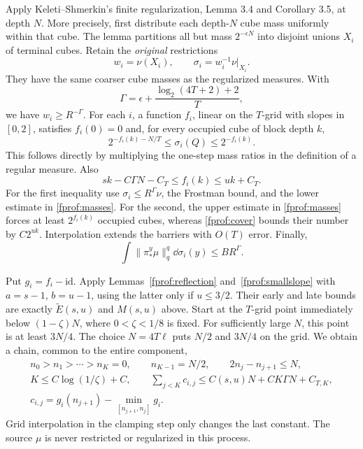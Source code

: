 Apply Keleti--Shmerkin's finite regularization, Lemma 3.4 and Corollary 3.5, at depth \(N\). More precisely, first distribute each depth-\(N\) cube mass uniformly within that cube. The lemma partitions all but mass \(2^{-\epsilon N}\) into disjoint unions \(X_i\) of terminal cubes. Retain the \emph{original} restrictions
$$
 w_i=\nu(X_i),\qquad \sigma_i=w_i^{-1}\nu|_{X_i}.
$$
They have the same coarser cube masses as the regularized measures. With
$$
 \Gamma=\epsilon+\frac{\log_2(4T+2)+2}{T},
$$
we have \(w_i\geq R^{-\Gamma}\). For each \(i\), a function \(f_i\), linear on the \(T\)-grid with slopes in \([0,2]\), satisfies \(f_i(0)=0\) and, for every occupied cube of block depth \(k\),
\begin{equation}\label{fprof:masses}
 2^{-f_i(k)-N/T}\leq\sigma_i(Q)\leq2^{-f_i(k)}.
\end{equation}
This follows directly by multiplying the one-step mass ratios in the definition of a regular measure. Also
\begin{equation}\label{fprof:barriers}
 sk-C\Gamma N-C_T\leq f_i(k)\leq uk+C_T.
\end{equation}
For the first inequality use \(\sigma_i\leq R^\Gamma\nu\), the Frostman bound, and the lower estimate in \eqref{fprof:masses}. For the second, the upper estimate in \eqref{fprof:masses} forces at least \(2^{f_i(k)}\) occupied cubes, whereas \eqref{fprof:cover} bounds their number by \(C2^{uk}\). Interpolation extends the barriers with \(O(T)\) error. Finally,
\begin{equation}\label{fprof:radialcomponent}
 \int\|\pi^y_*\mu\|_q^q\dd\sigma_i(y)\leq B R^\Gamma.
\end{equation}

Put \(g_i=f_i-\mathrm{id}\). Apply Lemmas~\ref{fprof:reflection} and~\ref{fprof:smallslope} with
\(a=s-1\), \(b=u-1\), using the latter only if \(u\le3/2\).
Their early and late bounds are exactly \(\widetilde E(s,u)\) and \(M(s,u)\) above. Start at the \(T\)-grid point immediately
below \((1-\zeta)N\), where \(0<\zeta<1/8\) is fixed.
For sufficiently large \(N\), this point is at least \(3N/4\).
The choice \(N=4T\ell\) puts \(N/2\) and \(3N/4\) on the grid.
We obtain a chain, common to the entire component,
\begin{gather}\label{fprof:levels}
 n_0>n_1>\cdots>n_K=0,\qquad
 n_{K-1}=N/2,\qquad 2n_j-n_{j+1}\leq N,\\
 K\leq C\log(1/\zeta)+C,\qquad
 \sum_{j<K}c_{i,j}\leq C(s,u)N+C K\Gamma N+C_{T,K},\label{fprof:sumcost}\\
 c_{i,j}=g_i(n_{j+1})-\min_{[n_{j+1},n_j]}g_i.\nonumber
\end{gather}
Grid interpolation in the clamping step only changes the last constant. The source \(\mu\) is never restricted or regularized in this process.

